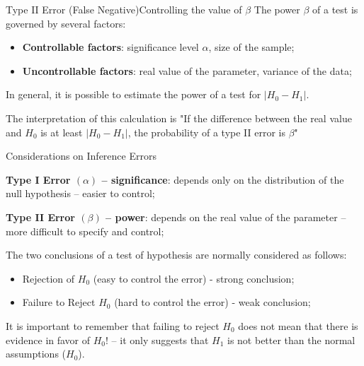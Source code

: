 \begin{frame}{Type II Error (False Negative)}{Controlling the value of $\beta$}
  The power $\beta$ of a test is governed by several factors:
  \begin{itemize}
    \item {\bf Controllable factors}: significance level $\alpha$, size of the sample;
    \item {\bf Uncontrollable factors}: real value of the parameter, variance of the data;
  \end{itemize}\bigskip

  In general, it is possible to estimate the power of a test for  $|H_0 - H_1|$.\bigskip

  The interpretation of this calculation is "If the difference between the real value and $H_0$ is at least $|H_0 - H_1|$, the probability of a type II error is $\beta$"
\end{frame}

\begin{frame}{Considerations on Inference Errors}

  {\bf Type I Error $(\alpha)$ -- significance}: depends only on the distribution of the null hypothesis -- easier to control;
  \medskip

  {\bf Type II Error $(\beta)$ -- power}: depends on the real value of the parameter -- more difficult to specify and control;
  \bigskip

The two conclusions of a test of hypothesis are normally considered as follows:
  \begin{exampleblock}{}
    \begin{itemize}
      \item Rejection of $H_0$ (easy to control the error) - strong conclusion;
      \item Failure to Reject $H_0$ (hard to control the error) - weak conclusion;
    \end{itemize}
  \end{exampleblock}
  \alert{It is important to remember that failing to reject $H_0$ does not mean that there is evidence in favor of $H_0$!} -- it only suggests that $H_1$ is not better than the normal assumptions ($H_0$).
\end{frame}

